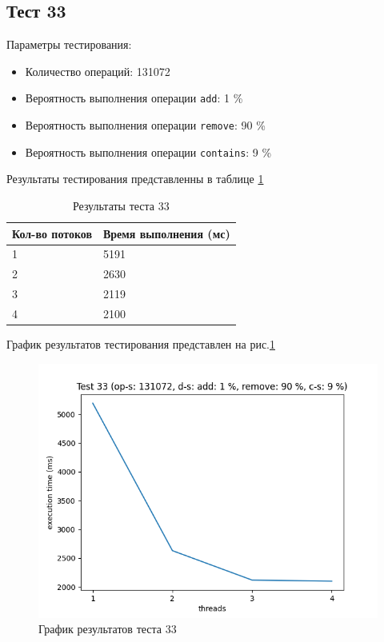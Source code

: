 \subsection*{Тест 33}

Параметры тестирования:

\begin{itemize}
    \item Количество операций: 131072
    \item Вероятность выполнения операции \verb|add|: 1 \%
    \item Вероятность выполнения операции \verb|remove|: 90 \%
    \item Вероятность выполнения операции \verb|contains|: 9 \%
\end{itemize}

Результаты тестирования представленны в таблице \ref{tab:results33}


\begin{table}[H]
    \centering
    \begin{tabular}{|l|l|}
        \hline
        Кол-во потоков & Время выполнения (мс) \\
        \hline
        1 & 5191 \\
        \hline
        2 & 2630 \\
        \hline
        3 & 2119 \\
        \hline
        4 & 2100 \\
        \hline
    \end{tabular}
    \caption{Результаты теста 33}
    \label{tab:results33}
\end{table}
        

График результатов тестирования представлен на рис.\ref{fig:plot33}

\begin{figure}[H]
    \centering
    \includegraphics[width=0.7\linewidth]{photo/plot33}
    \caption{График результатов теста 33}
    \label{fig:plot33}
\end{figure}

